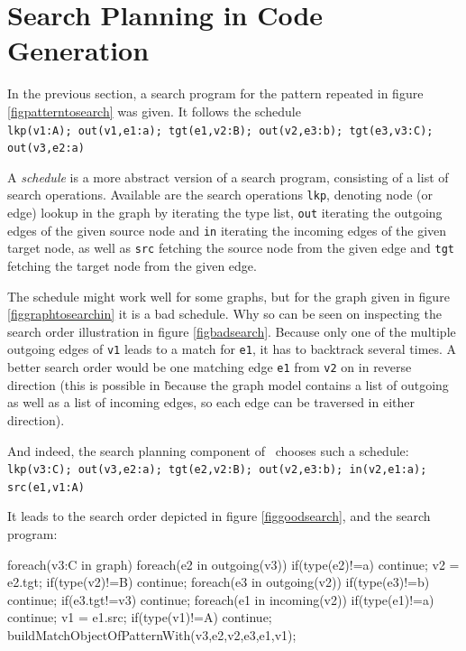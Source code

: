 \section{Search Planning in Code Generation}
\label{searchplanning}

In the previous section, a search program for the pattern repeated in figure \ref{figpatterntosearch} was given.
It follows the schedule\\
\texttt{lkp(v1:A); out(v1,e1:a); tgt(e1,v2:B); out(v2,e3:b); tgt(e3,v3:C); out(v3,e2:a)}

A \emph{schedule} is a more abstract version of a search program, consisting of a list of search operations.
Available are the search operations \texttt{lkp}, denoting node (or edge) lookup in the graph by iterating the type list, 
\texttt{out} iterating the outgoing edges of the given source node and \texttt{in} iterating the incoming edges of the given target node,
as well as \texttt{src} fetching the source node from the given edge and \texttt{tgt} fetching the target node from the given edge.

The schedule might work well for some graphs, but for the graph given in figure \ref{figgraphtosearchin} it is a bad schedule.
Why so can be seen on inspecting the search order illustration in figure \ref{figbadsearch}.
Because only one of the multiple outgoing edges of \texttt{v1} leads to a match for \texttt{e1}, it has to backtrack several times.
A better search order would be one matching edge \texttt{e1} from \texttt{v2} on in reverse direction 
(this is possible in \GrG\~ because the graph model contains a list of outgoing as well as a list of incoming edges, so each edge can be traversed in either direction).

And indeed, the search planning component of \GrG~chooses such a schedule:\\
\texttt{lkp(v3:C); out(v3,e2:a); tgt(e2,v2:B); out(v2,e3:b); in(v2,e1:a); src(e1,v1:A)}

It leads to the search order depicted in figure \ref{figgoodsearch}, and the search program:

\begin{csharp}
foreach(v3:C in graph) {
	foreach(e2 in outgoing(v3)) {
		if(type(e2)!=a) continue;
		v2 = e2.tgt;
		if(type(v2)!=B) continue;
		foreach(e3 in outgoing(v2)) {
			if(type(e3)!=b) continue;
			if(e3.tgt!=v3) continue;
				foreach(e1 in incoming(v2)) {
				if(type(e1)!=a) continue;
				v1 = e1.src;
				if(type(v1)!=A) continue;
				buildMatchObjectOfPatternWith(v3,e2,v2,e3,e1,v1);
			} 
		}
	}
}
\end{csharp}

